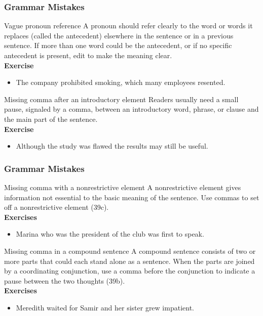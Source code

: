 \documentclass{beamer}
\begin{document}
\begin{frame}
\frametitle{Grammar Mistakes}
\begin{block}{Vague pronoun reference}
A pronoun should refer clearly to the word or words it replaces (called the antecedent) elsewhere in the sentence or in a previous sentence. If more than one word could be the antecedent, or if no specific antecedent is present, edit to make the meaning clear.\\
\textbf{Exercise}
\begin{itemize}
\item The company prohibited smoking, which many employees resented.
\end{itemize}
\end{block}

\begin{block}{Missing comma after an	introductory element}
Readers usually need a small pause, signaled by a comma, between an introductory word, phrase, or clause and the main part of the sentence. \\
\textbf{Exercise}
\begin{itemize}
\item Although the study was flawed the results may still be useful.
\end{itemize}
\end{block}
\end{frame}
\begin{frame}
\frametitle{Grammar Mistakes}
\begin{block}{Missing comma with a nonrestrictive element}
A nonrestrictive element gives information not essential to the basic meaning of the sentence. Use commas to set off a nonrestrictive element (39c).\\
\textbf{Exercises}
\begin{itemize}
\item Marina who was the president of the club was first to speak.
\end{itemize}
\end{block}

\begin{block}{Missing comma in a compound sentence}
A compound sentence consists of two or more parts that could each stand alone as a sentence. When the parts are joined by a coordinating conjunction, use a comma before the conjunction to indicate a pause between the two thoughts (39b).\\
\textbf{Exercises}
\begin{itemize}
\item Meredith waited for Samir and her sister grew impatient.
\end{itemize}
\end{block}
\end{frame}
\end{document}
